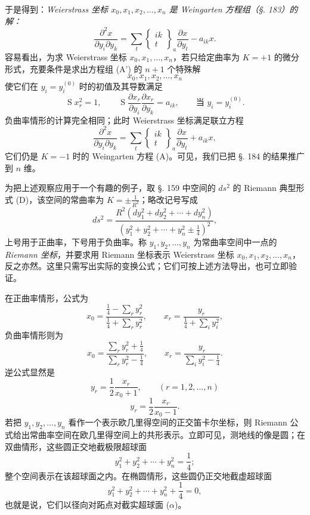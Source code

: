于是得到：\emph{Weierstrass 坐标 $x_0,x_1,x_2,\ldots,x_n$ 是 Weingarten 方程组（§. 183）的解：}
\[
\tag{A'}
 \frac{\partial^2x}{\partial y_i\partial y_k}=
 \sum_t\left\{\begin{matrix}ik\\ t\end{matrix}\right\}_a\frac{\partial x}{\partial y_t}-a_{ik}x.
\]
容易看出，为求 Weierstrass 坐标 $x_0,x_1,\ldots,x_n$，若只给定曲率为 $K=+1$ 的微分形式，充要条件是求出方程组 (A') 的 $n+1$ 个特殊解
\[
 x_0,x_1,x_2,\ldots,x_n
\]
使它们在 $y_i=y_i^{(0)}$ 时的初值及其导数满足
\[
 \mathop{\mathrm{S}}x_r^2=1,
 \qquad
 \mathop{\mathrm{S}}\frac{\partial x_r}{\partial y_i}\frac{\partial x_r}{\partial y_k}=a_{ik},
 \qquad \text{当 }y_i=y_i^{(0)}.
\]
负曲率情形的计算完全相同；此时 Weierstrass 坐标满足联立方程
\[
\tag{A''}
 \frac{\partial^2x}{\partial y_i\partial y_k}=\sum_t\left\{\begin{matrix}ik\\ t\end{matrix}\right\}_a\frac{\partial x}{\partial y_t}+a_{ik}x,
\]
它们仍是 $K=-1$ 时的 Weingarten 方程 (A)。可见，我们已把 §. 184 的结果推广到 $n$ 维。

为把上述观察应用于一个有趣的例子，取 §. 159 中空间的 $ds^2$ 的 Riemann 典型形式 (D)，该空间的常曲率为 $K=\pm\frac1{R^2}$；略改记号写成
\[
\tag{D*}
 ds^2=\frac{R^2(dy_1^2+dy_2^2+\cdots+dy_n^2)}{(y_1^2+y_2^2+\cdots+y_n^2\pm \frac14)^2},
\]
上号用于正曲率，下号用于负曲率。称 $y_1,y_2,\ldots,y_n$ 为常曲率空间中一点的\emph{Riemann 坐标}，并要求用 Riemann 坐标表示 Weierstrass 坐标 $x_0,x_1,x_2,\ldots,x_n$，反之亦然。这里只需写出实际的变换公式；它们可按上述方法导出，也可立即验证。

在正曲率情形，公式为
\[
\tag{I}
 x_0=\frac{\frac14-\sum_r y_r^2}{\frac14+\sum_r y_r^2},
 \qquad x_r=\frac{y_r}{\frac14+\sum_i y_i^2},
\]
负曲率情形则为
\[
\tag{II}
 x_0=\frac{\sum_r y_r^2+\frac14}{\sum_r y_r^2-\frac14},
 \qquad x_r=\frac{y_r}{\sum_i y_i^2-\frac14}.
\]
逆公式显然是
\[
\tag{I*}
 y_r=\frac12\frac{x_r}{x_0+1},
 \qquad (r=1,2,\ldots,n)
\]
\[
\tag{II*}
 y_r=\frac12\frac{x_r}{x_0-1}.
\]
若把 $y_1,y_2,\ldots,y_n$ 看作一个表示欧几里得空间的正交笛卡尔坐标，则 Riemann 公式给出常曲率空间在欧几里得空间上的共形表示。立即可见，测地线的像是圆；在双曲情形，这些圆正交地截极限超球面
\[
\tag{$\alpha$}
 y_1^2+y_2^2+\cdots+y_n^2=\frac14;
\]
整个空间表示在该超球面之内。在椭圆情形，这些圆仍正交地截虚超球面
\[
 y_1^2+y_2^2+\cdots+y_n^2+\frac14=0,
\]
也就是说，它们以径向对跖点对截实超球面 ($\alpha$)。
